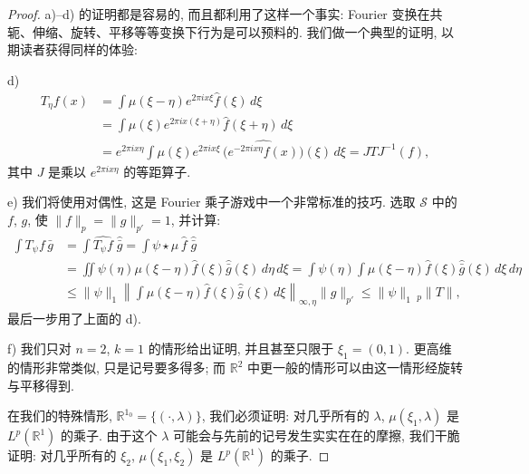 \begin{proof}
a)--d) 的证明都是容易的, 而且都利用了这样一个事实: Fourier 变换在共轭、伸缩、旋转、平移等等变换下行为是可以预料的. 我们做一个典型的证明, 以期读者获得同样的体验:

d)
\begin{align*}
T_{\eta}f(x)&=\int\mu(\xi-\eta)e^{2\pi ix\xi}\hat{f}(\xi)\,d\xi \\
&=\int\mu(\xi)e^{2\pi ix(\xi+\eta)}\hat{f}(\xi+\eta)\,d\xi \\
&=e^{2\pi ix\eta}\int\mu(\xi)e^{2\pi ix\xi}\,\widehat{\bigl(e^{-2\pi ix\eta}f(x)\bigr)}(\xi)\,d\xi=JTJ^{-1}(f),
\end{align*}
其中 $J$ 是乘以 $e^{2\pi ix\eta}$ 的等距算子.

e) 我们将使用对偶性, 这是 Fourier 乘子游戏中一个非常标准的技巧. 选取 $\mathcal{S}$ 中的 $f$, $g$, 使 $\|f\|_p=\|g\|_{p'}=1$, 并计算:
\begin{align*}
\int T_{\psi}f\,\bar{g}&=\int\widehat{T_{\psi}f}\;\widehat{\bar{g}}
=\int\psi\star\mu\,\hat{f}\;\widehat{\bar{g}} \\
&=\iint\psi(\eta)\mu(\xi-\eta)\hat{f}(\xi)\widehat{\bar{g}}(\xi)\,d\eta\,d\xi
=\int\psi(\eta)\int\mu(\xi-\eta)\hat{f}(\xi)\widehat{\bar{g}}(\xi)\,d\xi\,d\eta \\
&\leq\|\psi\|_1\left\|\int\mu(\xi-\eta)\hat{f}(\xi)\widehat{\bar{g}}(\xi)\,d\xi\right\|_{\infty,\eta}\|g\|_{p'}
\leq\|\psi\|_1\,{}_p\|T\|,
\end{align*}
最后一步用了上面的 d).

f) 我们只对 $n=2$, $k=1$ 的情形给出证明, 并且甚至只限于 $\xi_1=(0,1)$. 更高维的情形非常类似, 只是记号要多得多; 而 $\mathbb{R}^2$ 中更一般的情形可以由这一情形经旋转与平移得到.

在我们的特殊情形, $\mathbb{R}^{1_0}=\{(\cdot,\lambda)\}$, 我们必须证明: 对几乎所有的 $\lambda$, $\mu(\xi_1,\lambda)$ 是 $L^p(\mathbb{R}^1)$ 的乘子. 由于这个 $\lambda$ 可能会与先前的记号发生实实在在的摩擦, 我们干脆证明: 对几乎所有的 $\xi_2$, $\mu(\xi_1,\xi_2)$ 是 $L^p(\mathbb{R}^1)$ 的乘子.


\end{proof}
